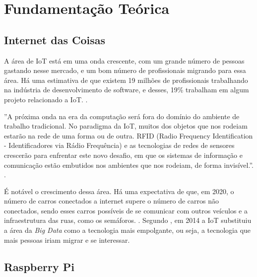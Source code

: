 \documentclass[
		12pt,				%
		openright,			%
		oneside,			%
		a4paper,			%
		chapter=TITLE,		%
		english,			%
		brazil				%
	]{abntex2}
\begin{document}


\chapter{Fundamentação Teórica}\label{cap:fundamentacao-teorica}

\section{Internet das Coisas}

A área de IoT está em uma onda crescente, com um grande número de pessoas gastando nesse mercado, e um bom número de profissionais migrando para essa área. Há uma estimativa de que existem 19 milhões de profissionais trabalhando na indústria de desenvolvimento de software, e desses, 19\% trabalham em algum projeto relacionado a IoT. \cite{cw-iot}.

\begin{citacao}
''A próxima onda na era da computação será fora do domínio do ambiente de trabalho tradicional. No paradigma da IoT, muitos dos objetos que nos rodeiam estarão na rede de uma forma ou de outra. RFID (Radio Frequency Identification - Identificadores via Rádio Frequência) e as tecnologias de redes de sensores crescerão para enfrentar este novo desafio, em que os sistemas de informação e comunicação estão embutidos nos ambientes que nos rodeiam, de forma invisível.''. \cite{iot-article}. 
\end{citacao}

É notável o crescimento dessa área. Há uma expectativa de que, em 2020, o número de carros conectados a internet supere o número de carros não conectados, sendo esses carros possíveis de se comunicar com outros veículos e a infraestrutura das ruas, como os semáforos. \cite{goldmansachs-iot}. Segundo , em 2014 a IoT substituiu a área da \textit{Big Data} como a tecnologia mais empolgante, ou seja, a tecnologia que mais pessoas iriam migrar e se interessar. 


\section{Raspberry Pi}
\end{document}
